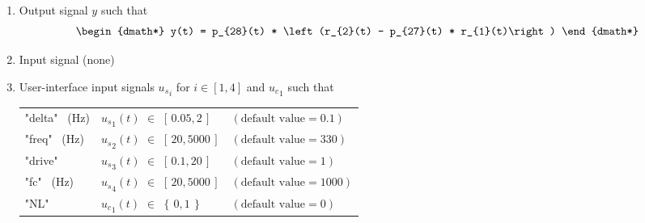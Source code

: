 \documentclass{article}
\begin{document}
\begin{enumerate}

\item Output signal $y$ such that
	\begin{dgroup*}
		\begin{dmath*}
				y(t) = p_{28}(t) *  \left(r_{2}(t) - p_{27}(t) * r_{1}(t)\right) 
		\end{dmath*}
	\end{dgroup*}

\item Input signal (none)

\item User-interface input signals  ${u_s}_i$ for $i \in [1,4]$ and  ${u_c}_1$ such that
	\begin{center}
		\begin{supertabular}{lll}
			\textsf{"delta"} \ (Hz) & ${u_s}_{1}(t)$ $\in$ $\left[\,0.05, 2\,\right]$ & $(\mbox{default value} = 0.1)$\\
			\textsf{"freq"} \ (Hz) & ${u_s}_{2}(t)$ $\in$ $\left[\,20, 5000\,\right]$ & $(\mbox{default value} = 330)$\\
			\textsf{"drive"}  & ${u_s}_{3}(t)$ $\in$ $\left[\,0.1, 20\,\right]$ & $(\mbox{default value} = 1)$\\
			\textsf{"fc"} \ (Hz) & ${u_s}_{4}(t)$ $\in$ $\left[\,20, 5000\,\right]$ & $(\mbox{default value} = 1000)$\\
			\textsf{"NL"}  & ${u_c}_{1}(t)$ $\in$ $\left\{\,0, 1\,\right\}$ & $(\mbox{default value} = 0)$\\
		\end{supertabular}
	\end{center}


\end{enumerate}
\end{document}
